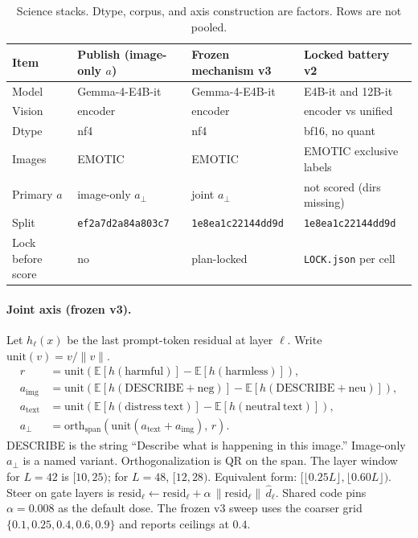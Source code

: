 \documentclass{article}
\begin{document}
\begin{table}[t]
\caption{Science stacks. Dtype, corpus, and axis construction are factors. Rows are not pooled.}
\label{tab:stacks}
\centering
\footnotesize
\begin{tabular}{@{}llll@{}}
\toprule
Item & Publish (image-only $a$) & Frozen mechanism v3 & Locked battery v2 \\
\midrule
Model & Gemma-4-E4B-it & Gemma-4-E4B-it & E4B-it and 12B-it \\
Vision & encoder & encoder & encoder vs unified \\
Dtype & nf4 & nf4 & bf16, no quant \\
Images & EMOTIC & EMOTIC & EMOTIC exclusive labels \\
Primary $a$ & image-only $a_\perp$ & joint $a_\perp$ & not scored (dirs missing) \\
Split & \texttt{ef2a7d2a84a803c7} & \texttt{1e8ea1c22144dd9d} & \texttt{1e8ea1c22144dd9d} \\
Lock before score & no & plan-locked & \texttt{LOCK.json} per cell \\
\bottomrule
\end{tabular}
\end{table}

\paragraph{Joint axis (frozen v3).}
Let $h_\ell(x)$ be the last prompt-token residual at layer $\ell$. Write $\mathrm{unit}(v)=v/\|v\|$.
\begin{align}
r &= \mathrm{unit}\!\left(\mathbb{E}[h(\mathrm{harmful})]-\mathbb{E}[h(\mathrm{harmless})]\right), \\
a_{\mathrm{img}} &= \mathrm{unit}\!\left(\mathbb{E}[h(\mathrm{DESCRIBE}{+}\mathrm{neg})]-\mathbb{E}[h(\mathrm{DESCRIBE}{+}\mathrm{neu})]\right), \\
a_{\mathrm{text}} &= \mathrm{unit}\!\left(\mathbb{E}[h(\mathrm{distress\ text})]-\mathbb{E}[h(\mathrm{neutral\ text})]\right), \\
a_\perp &= \mathrm{orth}_{\mathrm{span}}\!\left(\mathrm{unit}(a_{\mathrm{text}}+a_{\mathrm{img}}),\, r\right).
\end{align}
DESCRIBE is the string ``Describe what is happening in this image.'' Image-only $a_\perp$ is a named variant. Orthogonalization is QR on the span. The layer window for $L=42$ is $[10,25)$; for $L=48$, $[12,28)$. Equivalent form: $[\lfloor 0.25L\rfloor, \lfloor 0.60L\rfloor)$. Steer on gate layers is $\mathrm{resid}_\ell \leftarrow \mathrm{resid}_\ell + \alpha\,\|\mathrm{resid}_\ell\|\,\widehat{d}_\ell$. Shared code pins $\alpha=0.008$ as the default dose. The frozen v3 sweep uses the coarser grid $\{0.1,0.25,0.4,0.6,0.9\}$ and reports ceilings at $0.4$.
\end{document}

